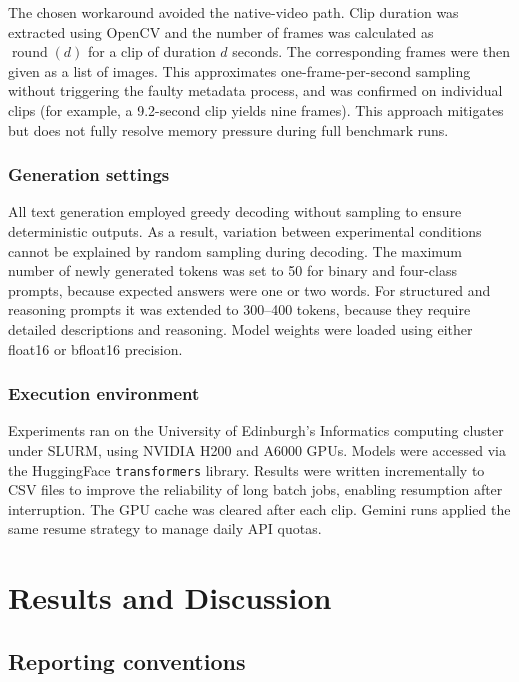 \documentclass[logo,msc]{infthesis}
\begin{document}
The chosen workaround avoided the native-video path. Clip duration was
extracted using OpenCV and the number of frames was calculated as
$\operatorname{round}(d)$ for a clip of duration $d$ seconds. The
corresponding frames were then given as a list of images. This approximates one-frame-per-second
sampling without triggering the faulty metadata process, and was confirmed
on individual clips (for example, a 9.2-second clip yields nine frames).
This approach mitigates but does not fully resolve memory pressure during
full benchmark runs.

\subsection{Generation settings}

All text generation employed greedy decoding without sampling to ensure
deterministic outputs. As a result, variation between experimental
conditions cannot be explained by random sampling during decoding. The
maximum number of newly generated tokens was set to 50 for binary and
four-class prompts, because expected answers were one or two words. For
structured and reasoning prompts it was extended to 300--400 tokens,
because they require detailed descriptions and reasoning. Model weights
were loaded using either float16 or bfloat16 precision.

\subsection{Execution environment}

Experiments ran on the University of Edinburgh's Informatics computing
cluster under SLURM, using NVIDIA H200 and A6000 GPUs. Models were accessed
via the HuggingFace \texttt{transformers} library. Results were written
incrementally to CSV files to improve the reliability of long batch jobs,
enabling resumption after interruption. The GPU cache was cleared after
each clip. Gemini runs applied the same resume strategy to manage daily API
quotas.

\chapter{Results and Discussion}

\section{Reporting conventions}
\end{document}
